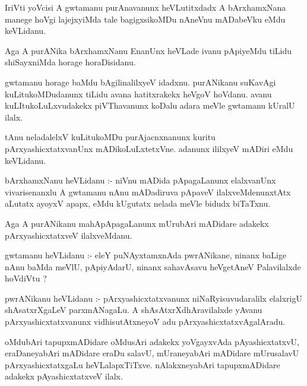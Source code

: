 \documentclass{article}
\begin{document}
\begin{mn}
IriVti  yoVcisi  A  gwtamanu  purAnavanunx  heVLutitxdadx  A  bArxhamxNana  manege  hoVgi  lajejxyiMda  
tale  bagigxsikoMDu  nAneVnu  mADabeVku  eMdu  keVLidanu.
\end{mn}

\begin{mn}
Aga  A  purANika  bArxhamxNanu  EnanUnx  heVLade  ivanu  pApiyeMdu  tiLidu  shiSayxniMda  horage  horaDisidanu.  
\end{mn}

\begin{mn}
gwtamanu  horage  baMdu  bAgilinalilxyeV  idadxnu.  purANikanu  suKavAgi  kuLitukoMDudanunx  tiLidu  avana  hatitxrakekx  
heVgoV  hoVdanu.  avanu  kuLItukoLuLxvudakekx  piVThavanunx  koDalu  adara  meVle  gwtamanu  kUralU  ilalx.  
\end{mn}

\begin{mn}
tAnu  neladalelxV  kuLitukoMDu  purAjacnxnanunx  kuritu  pArxyashicxtatxvanUnx  mADikoLuLxtetxVne.  adanunx  ililxyeV  
mADiri  eMdu  keVLidanu.
\end{mn}

\begin{mn}
bArxhamxNanu  heVLidanu :- niVnu  mADida  pApagaLanunx  elalxvanUnx  vivarisenanxlu  A  gwtamanu  nAnu  
mADadiruva  pApaveV  ilalxveMdenunxtAtx  aLutatx  ayoyxV  apapx,  eMdu  kUgutatx  nelada  meVle  bidudx biTaTxnu.
\end{mn}

\begin{mn}
Aga  A  purANikanu  mahApApagaLanunx  mUrubAri  mADidare  adakekx  pArxyashicxtatxveV  ilalxveMdanu.
\end{mn}

\begin{mn}
gwtamanu  heVLidanu :- eleY  puNAyxtamxnAda  pwrANikane,  ninanx  baLige  nAnu  baMda meVlU,  pApiyAdarU,  
ninanx  sahavAsavu  heVgetAneV  Palavilalxde  hoVdiVtu ?
\end{mn}

\begin{mn}
pwrANikanu  heVLidanu :- pArxyashicxtatxvanunx  niNaRyisuvudaralilx  elalxrigU  shAsatxrXgaLeV  parxmANagaLu.  
A  shAsAtxrXdhAravilalxde  yAvanu  pArxyashicxtatxvanunx  vidhisutAtxneyoV  adu  pArxyashicxtatxvAgalAradu.
\end{mn}

\begin{mn}
oMdubAri  tapupxmADidare  oMdusAri  adakekx  yoVgayxvAda  pAyashicxtatxvU,  eraDaneyabAri  mADidare  eraDu salavU,  
mUraneyabAri  mADidare  mUrusalavU  pArxyashicxtatxgaLu  heVLalapxTiTxve.  nAlakxneyabAri  tapupxmADidare  adakekx  
pAyashicxtatxveV  ilalx.
\end{mn}
\end{document}
